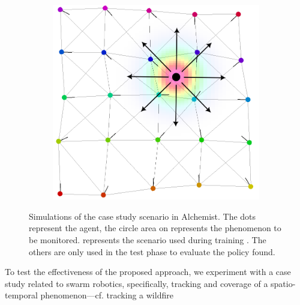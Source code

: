 \begin{figure}
\begin{subfigure}[b]{0.32\linewidth}
      \caption{}
      \label{fig:two}
  \end{subfigure}
  \begin{subfigure}[b]{0.32\linewidth}
      \includegraphics[width=\textwidth]{papers/acsos2023/imgs/example-moving.png}
      \caption{}
      \label{fig:moving}
  \end{subfigure}

 
  \caption[Simulations of the case study scenario in Alchemist for \ac{FIRL}.]{Simulations of the case study scenario in Alchemist. 
  The dots represent the agent, 
  the circle area on represents the phenomenon to be monitored.
   represents the scenario used during training . 
  The others  are only used in the test phase to evaluate the policy found. }
  \label{fig:scenarios}
\end{figure}
To test the effectiveness of the proposed approach, 
 we experiment with a case study related to swarm robotics, 
 specifically, tracking and coverage of a spatio-temporal phenomenon---cf. tracking a wildfire 
